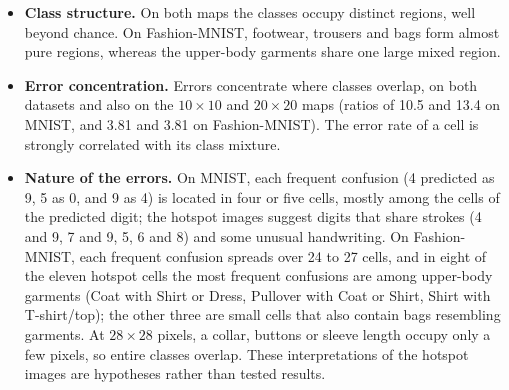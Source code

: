 \documentclass{scrartcl}
\begin{document}
\begin{itemize}
  \item \textbf{Class structure.} On both maps the classes occupy distinct regions, well beyond chance. On Fashion-MNIST, footwear, trousers and bags form almost pure regions, whereas the upper-body garments share one large mixed region.
  \item \textbf{Error concentration.} Errors concentrate where classes overlap, on both datasets and also on the $10\times10$ and $20\times20$ maps (ratios of 10.5 and 13.4 on MNIST, and 3.81 and 3.81 on Fashion-MNIST). The error rate of a cell is strongly correlated with its class mixture.
  \item \textbf{Nature of the errors.} On MNIST, each frequent confusion (4 predicted as 9, 5 as 0, and 9 as 4) is located in four or five cells, mostly among the cells of the predicted digit; the hotspot images suggest digits that share strokes (4 and 9, 7 and 9, 5, 6 and 8) and some unusual handwriting. On Fashion-MNIST, each frequent confusion spreads over 24 to 27 cells, and in eight of the eleven hotspot cells the most frequent confusions are among upper-body garments (Coat with Shirt or Dress, Pullover with Coat or Shirt, Shirt with T-shirt/top); the other three are small cells that also contain bags resembling garments. At $28\times28$ pixels, a collar, buttons or sleeve length occupy only a few pixels, so entire classes overlap. These interpretations of the hotspot images are hypotheses rather than tested results.
\end{itemize}
\end{document}
